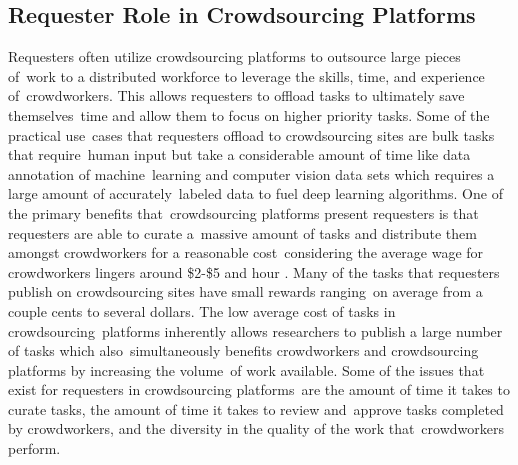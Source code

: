 \documentclass[letterpaper,12pt]{article}
\begin{document}
\subsection{Requester Role in Crowdsourcing Platforms}
Requesters often utilize crowdsourcing platforms to outsource large pieces of\ 
work to a distributed workforce to leverage the skills, time, and experience of\ 
crowdworkers. This allows requesters to offload tasks to ultimately save themselves\ 
time and allow them to focus on higher priority tasks. Some of the practical use\ 
cases that requesters offload to crowdsourcing sites are bulk tasks that require\ 
human input but take a considerable amount of time like data annotation of machine\ 
learning and computer vision data sets which requires a large amount of accurately\ 
labeled data to fuel deep learning algorithms. One of the primary benefits that\
crowdsourcing platforms present requesters is that requesters are able to curate a\ 
massive amount of tasks and distribute them amongst crowdworkers for a reasonable cost\ 
considering the average wage for crowdworkers lingers around \$2-\$5 and hour \cite{Kaplan2018,hara2018data}.
Many of the tasks that requesters publish on crowdsourcing sites have small rewards ranging\
on average from a couple cents to several dollars. The low average cost of tasks in crowdsourcing\
platforms inherently allows researchers to publish a large number of tasks which also\
simultaneously benefits crowdworkers and crowdsourcing platforms by increasing the volume\
of work available. Some of the issues that exist for requesters in crowdsourcing platforms\
are the amount of time it takes to curate tasks, the amount of time it takes to review and\
approve tasks completed by crowdworkers, and the diversity in the quality of the work that\
crowdworkers perform.
\end{document}
